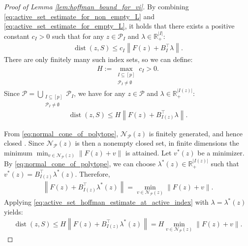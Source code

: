 \documentclass{article}
\DeclareMathOperator{\dist}{dist}
\newcommand{\R}{\mathbb{R}}
\theoremstyle{plain}
\begin{document}
\begin{proof}[Proof of Lemma \ref{lem:hoffman_bound_for_vi}]
    By combining \eqref{eq:active_set_estimate_for_non_empty_L} and \eqref{eq:active_set_estimate_for_empty_L}, it holds that there exists a positive constant $c_I > 0$ such that for any $z\in \mathcal{P}_I$ and $\lambda\in \R^{|I|}_+$:
    \begin{align*}
        \dist(z, S) \leq c_I \left\|F(z) + B_I^{\top}\lambda\right\|.
    \end{align*}
    There are only finitely many such index sets, so we can define:
    \begin{align*}
        H := \max_{\substack{I\subseteq [p] \\ \mathcal{P}_I \neq \emptyset}} c_I > 0.
    \end{align*}
    Since $\mathcal{P} = \bigcup_{\substack{I\subseteq [p] \\ \mathcal{P}_I \neq \emptyset}} \mathcal{P}_I$, we have for any $z\in \mathcal{P}$ and $\lambda \in \R^{|I(z)|}_+$:
    \begin{align}
        \dist(z, S) \leq H\left\|F(z) + B_{I(z)}^{\top}\lambda\right\|.
        \label{eq:active_set_hoffman_estimate_at_active_index}
    \end{align}

    From \eqref{eq:normal_cone_of_polytope}, $\mathcal{N}_{\mathcal{P}}(z)$ is finitely generated, and hence closed \citep[Theorem 19.1]{rockafellar1997convex}.
    Since $\mathcal{N}_{\mathcal{P}}(z)$ is then a nonempty closed set, in finite dimensions the minimum $\min_{v\in \mathcal{N}_{\mathcal{P}}(z)}\left\|F(z) + v\right\|$ is attained.
    Let $v^{\ast}(z)$ be a minimizer.
    By \eqref{eq:normal_cone_of_polytope}, we can choose $\lambda^{\ast}(z)\in \R^{|I(z)|}_+$ such that $v^{\ast}(z) = B_{I(z)}^{\top}\lambda^{\ast}(z)$.
    Therefore,
    \begin{align*}
        \left\|F(z) + B_{I(z)}^{\top}\lambda^{\ast}(z)\right\| = \min_{v\in \mathcal{N}_{\mathcal{P}}(z)}\left\|F(z) + v\right\|.
    \end{align*}
    Applying \eqref{eq:active_set_hoffman_estimate_at_active_index} with $\lambda = \lambda^{\ast}(z)$ yields:
    \begin{align*}
        \dist(z, S) \leq H\left\|F(z) + B_{I(z)}^{\top}\lambda^{\ast}(z)\right\| = H \min_{v\in \mathcal{N}_{\mathcal{P}}(z)}\left\|F(z) + v\right\|.
    \end{align*}
\end{proof}
\end{document}
